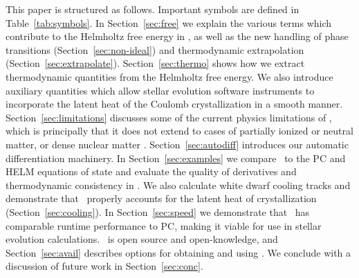This paper is structured as follows.
Important symbols are defined in Table~\ref{tab:symbols}.
In Section~\ref{sec:free} we explain the various terms which contribute to the Helmholtz free energy in \skye, as well as the new handling of phase transitions (Section~\ref{sec:non-ideal}) and thermodynamic extrapolation (Section~\ref{sec:extrapolate}).
Section~\ref{sec:thermo} shows how we extract thermodynamic quantities from the Helmholtz free energy.
We also introduce auxiliary quantities which allow stellar evolution software instruments to incorporate the latent heat of the Coulomb crystallization in a smooth manner.
Section~\ref{sec:limitations} discusses some of the current physics limitations of \skye,
which is principally that it does not extend to cases of partially ionized or neutral matter, or dense nuclear matter \citep{hempel_2012_aa}.
Section~\ref{sec:autodiff} introduces our automatic differentiation machinery.
In Section~\ref{sec:examples} we compare \skye\ to the PC and HELM equations of state and evaluate the quality of derivatives and thermodynamic consistency in \skye.
We also calculate white dwarf cooling tracks and demonstrate that \skye\ properly accounts for the latent heat of crystallization
(Section~\ref{sec:cooling}).
In Section~\ref{sec:speed} we demonstrate that \skye\ has comparable runtime performance to PC, making it viable for use in stellar evolution calculations.
\skye\ is open source and open-knowledge, and Section~\ref{sec:avail} describes options for obtaining and using \skye.
We conclude with a discussion of future work in Section~\ref{sec:conc}.

